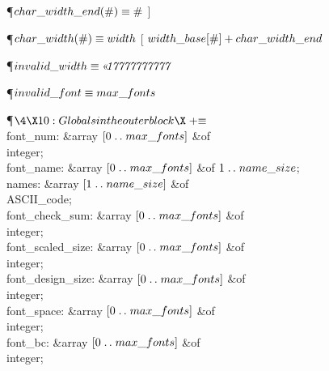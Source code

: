 \Y\P\D {}$\\{char\_width\_end}(\#)\S\#$ ] \par
\P\D $\\{char\_width}(\#)\S\\{width}$ [ $\\{width\_base}[\#]+\\{char\_width%
\_end}$\par
\P\D {}$\\{invalid\_width}\S\O{17777777777}$\par
\P\D {}$\\{invalid\_font}\S\\{max\_fonts}$\par
\Y\P$\4\X10:Globals in the outer block\X\mathrel{+}\S$\6
\4\\{font\_num}: \&{array} $[0\to\\{max\_fonts}]$ \1\&{of}\5
\\{integer};\2\6
\4\\{font\_name}: \&{array} $[0\to\\{max\_fonts}]$ \1\&{of}\5
$1\to\\{name\_size}$;\2\6
\4\\{names}: \&{array} $[1\to\\{name\_size}]$ \1\&{of}\5
\\{ASCII\_code};\2\6
\4\\{font\_check\_sum}: \&{array} $[0\to\\{max\_fonts}]$ \1\&{of}\5
\\{integer};\2\6
\4\\{font\_scaled\_size}: \&{array} $[0\to\\{max\_fonts}]$ \1\&{of}\5
\\{integer};\2\6
\4\\{font\_design\_size}: \&{array} $[0\to\\{max\_fonts}]$ \1\&{of}\5
\\{integer};\2\6
\4\\{font\_space}: \&{array} $[0\to\\{max\_fonts}]$ \1\&{of}\5
\\{integer};\2\6
\4\\{font\_bc}: \&{array} $[0\to\\{max\_fonts}]$ \1\&{of}\5
\\{integer};\2\6
